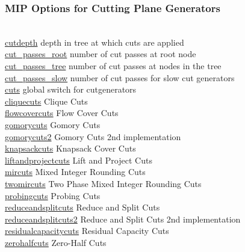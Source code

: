 \subsubsection{MIP Options for Cutting Plane Generators}
\begin{tabbing}
\hspace {1.3in} \= \\
\hyperlink{cutdepth}
{cutdepth} \> depth in tree at which cuts are applied \\
\hyperlink{cut_passes_root}
{cut\_passes\_root} \> number of cut passes at root node \\
\hyperlink{cut_passes_tree}
{cut\_passes\_tree} \> number of cut passes at nodes in the tree \\
\hyperlink{cut_passes_slow}
{cut\_passes\_slow} \> number of cut passes for slow cut generators \\
\hyperlink{cuts}
{cuts} \> global switch for cutgenerators \\
\hyperlink{cliquecuts}
{cliquecuts} \> Clique Cuts \\
\hyperlink{flowcovercuts}
{flowcovercuts} \> Flow Cover Cuts \\
\hyperlink{gomorycuts}
{gomorycuts} \> Gomory Cuts \\
\hyperlink{gomorycuts2}
{gomorycuts2} \> Gomory Cuts 2nd implementation \\
\hyperlink{knapsackcuts}
{knapsackcuts} \> Knapsack Cover Cuts \\
\hyperlink{liftandprojectcuts}
{liftandprojectcuts} \> Lift and Project Cuts \\
\hyperlink{mircuts}
{mircuts} \> Mixed Integer Rounding Cuts \\
\hyperlink{twomircuts}
{twomircuts} \> Two Phase Mixed Integer Rounding Cuts \\
\hyperlink{probingcuts}
{probingcuts} \> Probing Cuts \\
\hyperlink{reduceandsplitcuts}
{reduceandsplitcuts} \> Reduce and Split Cuts \\
\hyperlink{reduceandsplitcuts2}
{reduceandsplitcuts2} \> Reduce and Split Cuts 2nd implementation \\
\hyperlink{residualcapacitycuts}
{residualcapacitycuts} \> Residual Capacity Cuts \\
\hyperlink{zerohalfcuts}
{zerohalfcuts} \> Zero-Half Cuts \\
\end{tabbing}


